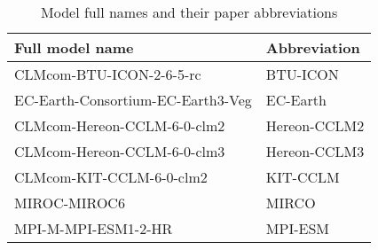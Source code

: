 \begin{table}[htbp]
  \centering
  \caption{Model full names and their paper abbreviations}
  \label{tab:model_abbrevs}
  \begin{tabular}{p{8cm}l}
    \toprule
    Full model name & Abbreviation \\
    \midrule
    CLMcom-BTU-ICON-2-6-5-rc & BTU-ICON \\
    EC-Earth-Consortium-EC-Earth3-Veg & EC-Earth \\
    CLMcom-Hereon-CCLM-6-0-clm2 & Hereon-CCLM2 \\
    CLMcom-Hereon-CCLM-6-0-clm3 & Hereon-CCLM3 \\
    CLMcom-KIT-CCLM-6-0-clm2 & KIT-CCLM \\
    MIROC-MIROC6 & MIRCO \\
    MPI-M-MPI-ESM1-2-HR & MPI-ESM \\
    \bottomrule
  \end{tabular}
\end{table}
